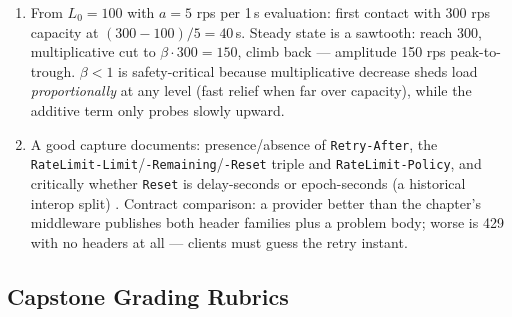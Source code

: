 \begin{enumerate}[label=\textbf{E14.\arabic*.}, leftmargin=2.8em]
    and \texttt{rate:\{tenant\}} (token bucket). One Lua script checking
    both atomically is preferred; two scripts invite a quota/rate ordering
    hazard. \texttt{GET /v1/usage} returns
    \texttt{\{quota\_limit, quota\_used, quota\_remaining, resets\_at,
    rate\_limit, rate\_remaining\}}. A client at 99/100 with an empty
    per-second bucket gets 429 with \texttt{Retry-After} from the rate
    layer while the response body/headers still show the quota layer's
    remaining 1 --- the two layers must be distinguishable.
  \item From $L_0=100$ with $a{=}5$ rps per 1\,s evaluation: first contact
    with 300 rps capacity at $(300-100)/5 = 40$\,s. Steady state is a
    sawtooth: reach 300, multiplicative cut to $\beta \cdot 300 = 150$,
    climb back --- amplitude 150 rps peak-to-trough. $\beta < 1$ is
    safety-critical because multiplicative decrease sheds load
    \emph{proportionally} at any level (fast relief when far over
    capacity), while the additive term only probes slowly upward.
  \item A good capture documents: presence/absence of \texttt{Retry-After},
    the \texttt{RateLimit-Limit}/\texttt{-Remaining}/\texttt{-Reset} triple
    and \texttt{RateLimit-Policy}, and critically whether \texttt{Reset} is
    delay-seconds or epoch-seconds (a historical interop split)
    \cite{ietf_ratelimit_headers}. Contract comparison: a provider better
    than the chapter's middleware publishes both header families plus a
    problem body; worse is 429 with no headers at all --- clients must
    guess the retry instant.
\end{enumerate}

\subsection{Capstone Grading Rubrics}

